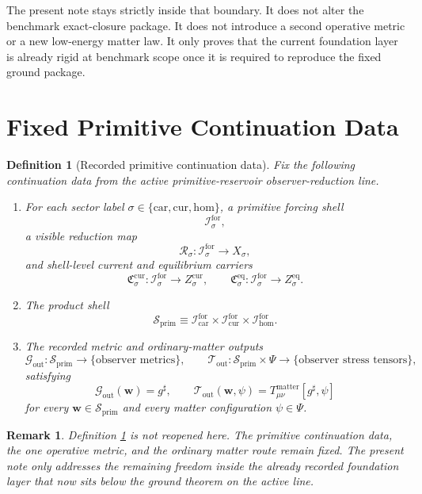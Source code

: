 \documentclass[11pt]{article}
\newcommand{\CompletedMetric}{g^{\sharp}}
\newcommand{\MatterSpace}{\Psi}
\newcommand{\Car}{\mathrm{car}}
\newcommand{\Cur}{\mathrm{cur}}
\newcommand{\Hom}{\mathrm{hom}}
\newcommand{\ForSpace}[1]{\mathcal I_{#1}^{\mathrm{for}}}
\newcommand{\PrimShell}{\mathcal S_{\mathrm{prim}}}
\newcommand{\Reduction}[1]{\mathcal R_{#1}}
\newcommand{\CurrentCarrier}[1]{\mathfrak C_{#1}^{\mathrm{cur}}}
\newcommand{\EqCarrier}[1]{\mathfrak C_{#1}^{\mathrm{eq}}}
\newcommand{\MetricOut}{\mathscr G_{\mathrm{out}}}
\newcommand{\MatterOut}{\mathscr T_{\mathrm{out}}}
\newtheorem{definition}{Definition}
\newtheorem{remark}{Remark}
\begin{document}
The present note stays strictly inside that boundary. It does not alter the benchmark exact-closure package. It does not introduce a second operative metric or a new low-energy matter law. It only proves that the current foundation layer is already rigid at benchmark scope once it is required to reproduce the fixed ground package.

\section{Fixed Primitive Continuation Data}

\begin{definition}[Recorded primitive continuation data]
\label{def:fixed}
Fix the following continuation data from the active primitive-reservoir observer-reduction line.
\begin{enumerate}
    \item For each sector label \(\sigma\in\{\Car,\Cur,\Hom\}\), a primitive forcing shell
    \[
    \ForSpace{\sigma},
    \]
    a visible reduction map
    \[
    \Reduction{\sigma}:\ForSpace{\sigma}\to X_{\sigma},
    \]
    and shell-level current and equilibrium carriers
    \[
    \CurrentCarrier{\sigma}:\ForSpace{\sigma}\to Z_{\sigma}^{\mathrm{cur}},
    \qquad
    \EqCarrier{\sigma}:\ForSpace{\sigma}\to Z_{\sigma}^{\mathrm{eq}}.
    \]
    \item The product shell
    \[
    \PrimShell
    \equiv
    \ForSpace{\Car}\times \ForSpace{\Cur}\times \ForSpace{\Hom}.
    \]
    \item The recorded metric and ordinary-matter outputs
    \[
    \MetricOut:\PrimShell\to\{\text{observer metrics}\},
    \qquad
    \MatterOut:\PrimShell\times\MatterSpace\to\{\text{observer stress tensors}\},
    \]
    satisfying
    \begin{equation}
    \MetricOut(\mathbf w)=\CompletedMetric,
    \qquad
    \MatterOut(\mathbf w,\psi)
    =
    T_{\mu\nu}^{\mathrm{matter}}[\CompletedMetric,\psi]
    \label{eq:fixedoutputs}
    \end{equation}
    for every \(\mathbf w\in\PrimShell\) and every matter configuration \(\psi\in\MatterSpace\).
\end{enumerate}
\end{definition}

\begin{remark}
Definition \ref{def:fixed} is not reopened here. The primitive continuation data, the one operative metric, and the ordinary matter route remain fixed. The present note only addresses the remaining freedom inside the already recorded foundation layer that now sits below the ground theorem on the active line.
\end{remark}
\end{document}
